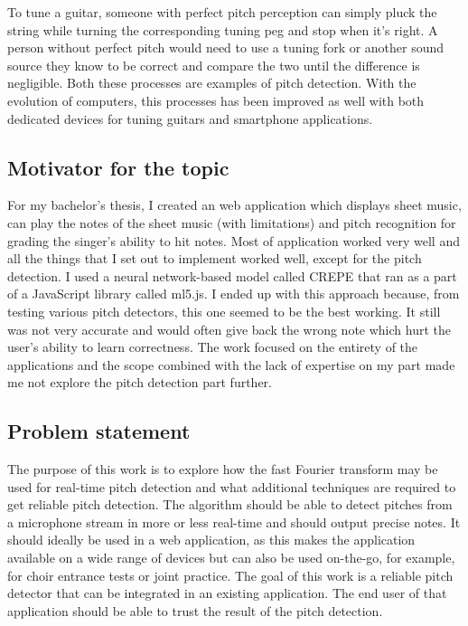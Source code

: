 To tune a guitar, someone with perfect pitch perception can simply pluck the string while turning the corresponding tuning peg and stop when it's right. A person without perfect pitch would need to use a tuning fork or another sound source they know to be correct and compare the two until the difference is negligible. Both these processes are examples of pitch detection. With the evolution of computers, this processes has been improved as well with both dedicated devices for tuning guitars and smartphone applications. 

\subsection{Motivator for the topic}
For my bachelor's thesis, I created an web application which displays sheet music, can play the notes of the sheet music (with limitations) and pitch recognition for grading the singer's ability to hit notes. Most of application worked very well and all the things that I set out to implement worked well, except for the pitch detection. I used a neural network-based model called CREPE that ran as a part of a JavaScript library called ml5.js. I ended up with this approach because, from testing various pitch detectors, this one seemed to be the best working. It still was not very accurate and would often give back the wrong note which hurt the user's ability to learn correctness. The work focused on the entirety of the applications and the scope combined with the lack of expertise on my part made me not explore the pitch detection part further.  

\subsection{Problem statement}
The purpose of this work is to explore how the fast Fourier transform may be used for real-time pitch detection and what additional techniques are required to get reliable pitch detection. The algorithm should be able to detect pitches from a microphone stream in more or less real-time and should output precise notes. It should ideally be used in a web application, as this makes the application available on a wide range of devices but can also be used on-the-go, for example, for choir entrance tests or joint practice. The goal of this work is a reliable pitch detector that can be integrated in an existing application. The end user of that application should be able to trust the result of the pitch detection. 
